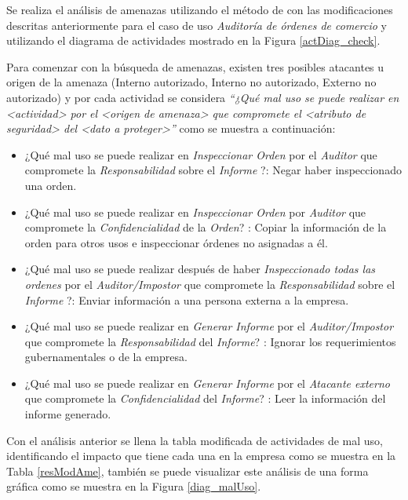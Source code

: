 Se realiza el análisis de amenazas utilizando el método de \cite{BraFerVan08} con las modificaciones descritas anteriormente para el caso de uso \textit{Auditoría de órdenes de comercio} y utilizando el diagrama de actividades mostrado en la Figura \ref{actDiag_check}.

\vspace{0.3cm}

Para comenzar con la búsqueda de amenazas, existen tres posibles atacantes u origen de la amenaza (Interno autorizado, Interno no autorizado, Externo no autorizado) y por cada actividad se considera \textit{``¿Qué mal uso se puede realizar en <actividad> por el <origen de amenaza> que compromete el <atributo de seguridad> del <dato a proteger>''} como se muestra a continuación:

\begin{itemize}[noitemsep]
	\item ¿Qué mal uso se puede realizar en \textit{Inspeccionar Orden} por el \textit{Auditor} que compromete la \textit{Responsabilidad} sobre el \textit{Informe} ?: Negar haber inspeccionado una orden.
	\item ¿Qué mal uso se puede realizar en \textit{Inspeccionar Orden} por \textit{Auditor} que compromete la \textit{Confidencialidad} de la \textit{Orden}? : Copiar la información de la orden para otros usos e inspeccionar órdenes no asignadas a él. 
	\item ¿Qué mal uso se puede realizar después de haber \textit{Inspeccionado todas las ordenes} por el \textit{Auditor/Impostor} que compromete la \textit{Responsabilidad} sobre el \textit{Informe} ?: Enviar información a una persona externa a la empresa.
	\item ¿Qué mal uso se puede realizar en \textit{Generar Informe} por el \textit{Auditor/Impostor} que compromete la \textit{Responsabilidad} del \textit{Informe}? : Ignorar los requerimientos gubernamentales o de la empresa.
	\item ¿Qué mal uso se puede realizar en \textit{Generar Informe} por el \textit{Atacante externo} que compromete la \textit{Confidencialidad} del \textit{Informe}? : Leer la información del informe generado.
\end{itemize} 

Con el análisis anterior se llena la tabla modificada de actividades de mal uso, identificando el impacto que tiene cada una en la empresa como se muestra en la Tabla \ref{resModAme}, también se puede visualizar este análisis de una forma gráfica como se muestra en la Figura \ref{diag_malUso}.

